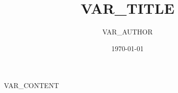 \documentclass[12pt,a4paper,reqno]{amsart}
\begin{document}
\title{VAR_TITLE}
\author{VAR_AUTHOR}
\date{\today}
\maketitle

VAR_CONTENT
\end{document}
